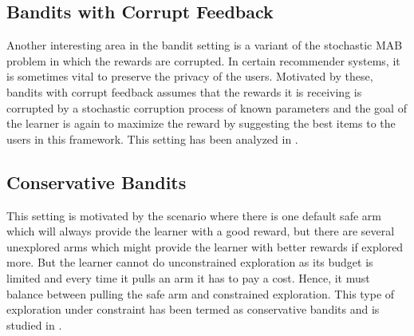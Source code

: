 \subsection{Bandits with Corrupt Feedback}

Another interesting area in the bandit setting is a variant of the stochastic MAB problem in which the
rewards are corrupted. In certain recommender systems, it is sometimes vital to preserve the privacy of the users. Motivated by these, bandits with corrupt feedback assumes that the rewards it is receiving is corrupted by a stochastic corruption process of known parameters and the goal of the learner is again to maximize the reward by suggesting the best items to the users in this framework. This setting has been analyzed in \citet{DBLP:journals/corr/abs-1708-05033}.


\subsection{Conservative Bandits}

This setting is motivated by the scenario where there is one default safe arm which will always provide the learner with a good reward, but there are several unexplored arms which might provide the learner with better rewards if explored more. But the learner cannot do unconstrained exploration as its budget is limited and every time it pulls an arm it has to pay a cost. Hence, it must balance between pulling the safe arm and constrained exploration. This type of exploration under constraint has been termed as conservative bandits and is studied in \citet{DBLP:conf/icml/WuSLS16}.